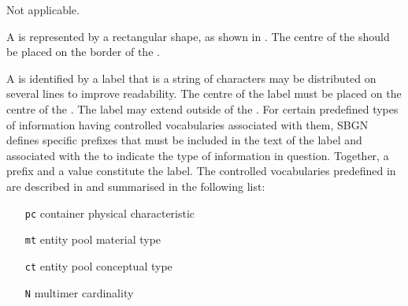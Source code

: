\begin{glyphDescription}

\glyphSboTerm
Not applicable.



\glyphContainer
A  is represented by a rectangular shape, as shown in .
The centre of the  should be placed on the border of the .

\glyphLabel
A  is identified by a label that is  a string of characters  may be distributed on several lines to improve readability.
The centre of the label must be placed on the centre of the .
The label may extend outside of the .
  
For certain predefined types of information having controlled vocabularies associated with them, SBGN defines specific prefixes that must be included in the text of the label and associated with the  to indicate the type of information in question. Together, a prefix and a value constitute the label. The controlled vocabularies predefined in \SBGNPDLone are described in  and summarised in the following list:

\begin{center}
  \begin{itemize}\setlength{\parskip}{0ex}
  \item[\texttt{pc}] container physical characteristic
  \item[\texttt{mt}] entity pool material type
  \item[\texttt{ct}] entity pool conceptual type
  \item[\texttt{N}]  multimer cardinality
  \end{itemize}
\end{center}


\end{glyphDescription}
